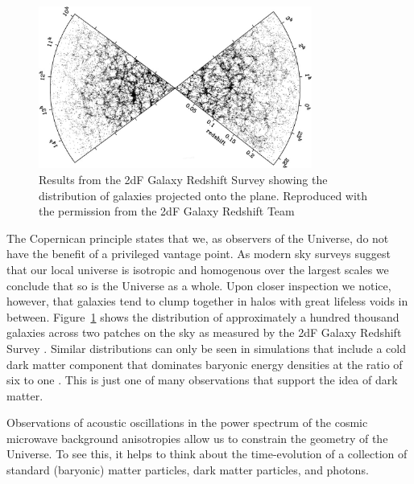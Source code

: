\documentclass[a4paper,12pt]{article}
\theoremstyle{remark}
\renewcommand{\=}[1]{\stackrel{#1}{=}} %
\theoremstyle{plain}
\theoremstyle{definition}
\begin{document}
\begin{figure}[t]
\begin{center}
    \includegraphics*[angle=0,width=0.8\textwidth]{img/slices_3deg_big_bw.png}
    \caption[Results from the 2dF Galaxy Redshift Survey]{Results from the 2dF Galaxy Redshift Survey showing the distribution of galaxies projected onto the plane. Reproduced with the permission from the 2dF Galaxy Redshift Team \cite{Colless2001,Colless2014}}
\label{fig:2dfs}
\end{center}
\end{figure}

The Copernican principle states that we, as observers of the Universe, do not have the benefit of a privileged vantage point. As modern sky surveys suggest that our local universe is isotropic and homogenous over the largest scales we conclude that so is the Universe as a whole. Upon closer inspection we notice, however, that galaxies tend to clump together in halos with great lifeless voids in between. Figure~\ref{fig:2dfs} shows the distribution of approximately a hundred thousand galaxies across two patches on the sky as measured by the 2dF Galaxy Redshift Survey \cite{Colless2001}. Similar distributions can only be seen in simulations that include a cold dark matter component that dominates baryonic energy densities at the ratio of six to one \cite{Springel2005}. This is just one of many observations that support the idea of dark matter.


Observations of acoustic oscillations in the power spectrum of the cosmic microwave background anisotropies allow us to constrain the geometry of the Universe. To see this, it helps to think about the time-evolution of a collection of standard (baryonic) matter particles, dark matter particles, and photons.
\end{document}
